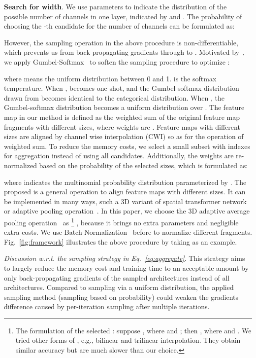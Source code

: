\documentclass{article}
\def\Figref#1{Fig.~\ref{#1}}
\def\Eqref#1{Eq.~\eqref{#1}}
\begin{document}
\textbf{Search for width}. We use parameters  to indicate the distribution of the possible number of channels in one layer, indicated by  and .
The probability of choosing the -th candidate for the number of channels can be formulated as:



However, the sampling operation in the above procedure is non-differentiable, which prevents us from back-propagating gradients through  to .
Motivated by~\cite{dong2019search}, we apply Gumbel-Softmax~\cite{jang2017categorical,maddison2017concrete} to soften the sampling procedure to optimize :

where  means the uniform distribution between 0 and 1.
 is the softmax temperature.
When ,  becomes one-shot, and the Gumbel-softmax distribution drawn from  becomes identical to the categorical distribution. When , the Gumbel-softmax distribution becomes a uniform distribution over .
The feature map in our method is defined as the weighted sum of the original feature map fragments with different sizes, where weights are . Feature maps with different sizes are aligned by channel wise interpolation (CWI) so as for the operation of weighted sum.
To reduce the memory costs, we select a small subset with indexes  for aggregation instead of using all candidates.
Additionally, the weights are re-normalized based on the probability of the selected sizes, which is formulated as:

where  indicates the multinomial probability distribution parameterized by .
The proposed  is a general operation to align feature maps with different sizes.
It can be implemented in many ways, such a 3D variant of spatial transformer network~\cite{jaderberg2015spatial} or adaptive pooling operation~\cite{he2015spatial}.
In this paper, we choose the 3D adaptive average pooling operation~\cite{he2015spatial} as \footnote{The formulation of the selected : suppose , where  and ; then , where  and .
We tried other forms of , e.g., bilinear and trilinear interpolation. They obtain similar accuracy but are much slower than our choice.}
, because it brings no extra parameters and negligible extra costs.
We use Batch Normalization~\cite{ioffe2015batch} before  to normalize different fragments.
\Figref{fig:framework} illustrates the above procedure by taking  as an example.



\textit{Discussion w.r.t. the sampling strategy in \Eqref{eq:aggregate}}.
This strategy aims to largely reduce the memory cost and training time to an acceptable amount by only back-propagating gradients of the sampled architectures instead of all architectures. Compared to sampling via a uniform distribution, the applied sampling method (sampling based on probability) could weaken the gradients difference caused by per-iteration sampling after multiple iterations.
\end{document}
